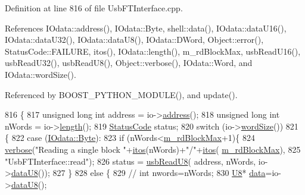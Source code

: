 Definition at line 816 of file Usb\+F\+T\+Interface.\+cpp.



References I\+Odata\+::address(), I\+Odata\+::\+Byte, shell\+::data(), I\+Odata\+::data\+U16(), I\+Odata\+::data\+U32(), I\+Odata\+::data\+U8(), I\+Odata\+::\+D\+Word, Object\+::error(), Status\+Code\+::\+F\+A\+I\+L\+U\+RE, itos(), I\+Odata\+::length(), m\+\_\+rd\+Block\+Max, usb\+Read\+U16(), usb\+Read\+U32(), usb\+Read\+U8(), Object\+::verbose(), I\+Odata\+::\+Word, and I\+Odata\+::word\+Size().



Referenced by B\+O\+O\+S\+T\+\_\+\+P\+Y\+T\+H\+O\+N\+\_\+\+M\+O\+D\+U\+L\+E(), and update().


\begin{DoxyCode}
816                                          \{
817   \textcolor{keywordtype}{unsigned} \textcolor{keywordtype}{long} \textcolor{keywordtype}{int} address = io->\hyperlink{classIOdata_afe410c86881b8c2082a08e5ce9843306}{address}();
818   \textcolor{keywordtype}{unsigned} \textcolor{keywordtype}{long} \textcolor{keywordtype}{int} nWords  = io->\hyperlink{classIOdata_abb40e71ce0290832a24857b4a1e7b1a3}{length}();
819   \hyperlink{classStatusCode}{StatusCode} status;
820   \textcolor{keywordflow}{switch} (io->\hyperlink{classIOdata_a91f9e8b4095ca8365a824e43be36b143}{wordSize}())
821   \{
822   \textcolor{keywordflow}{case} (\hyperlink{classIOdata_a37c53ebf4bf8d866aac8af572962a84ca00156611f08eeb1b5d361de809dafb8e}{IOdata::Byte}):
823     \textcolor{keywordflow}{if} (nWords<\hyperlink{classUsbFTInterface_a0f5050f1ed93392c8e5e4acaf7b75e1c}{m\_rdBlockMax}+1)\{
824       \hyperlink{classObject_a83d2db2df682907ea1115ad721c1c4a1}{verbose}(\textcolor{stringliteral}{"Reading a single block "}+\hyperlink{Tools_8h_af330027dbdafb9a30768b3613c553e60}{itos}(nWords)+\textcolor{stringliteral}{"/"}+\hyperlink{Tools_8h_af330027dbdafb9a30768b3613c553e60}{itos}(
      \hyperlink{classUsbFTInterface_a0f5050f1ed93392c8e5e4acaf7b75e1c}{m\_rdBlockMax}),
825           \textcolor{stringliteral}{"UsbFTInterface::read"});
826       status = \hyperlink{classUsbFTInterface_ab0803dd4c3ce3bf26dff4f4145b34546}{usbReadU8}( address, nWords, io->\hyperlink{classIOdata_a75e9c318dbac3a39402179070943d4bc}{dataU8}());    
827     \}
828     \textcolor{keywordflow}{else} \{
829       \textcolor{comment}{//      int nwords=nWords;}
830       \hyperlink{ICECALv3_8h_a3cb25ca6f51f003950f9625ff05536fc}{U8}* \hyperlink{namespaceshell_a5ea2525995cedc3efd69ea8a7f034d1e}{data}=io->\hyperlink{classIOdata_a75e9c318dbac3a39402179070943d4bc}{dataU8}();

\end{DoxyCode}
